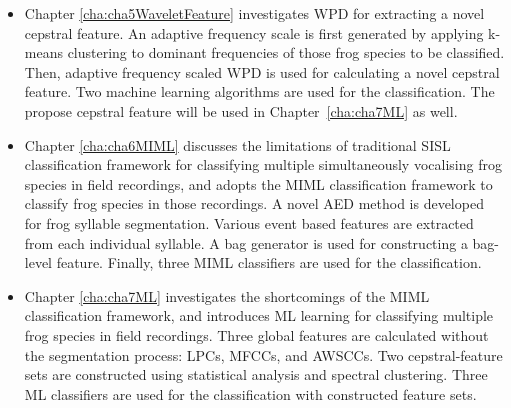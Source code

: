 \begin{itemize}
\item  Chapter \ref{cha:cha5WaveletFeature} investigates WPD for extracting a novel cepstral feature. An adaptive frequency scale is first generated by applying k-means clustering to dominant frequencies of those frog species to be classified. Then, adaptive frequency scaled WPD is used for calculating a novel cepstral feature. Two machine learning algorithms are used for the classification. The propose cepstral feature will be used in Chapter~\ref{cha:cha7ML} as well.




\item  Chapter \ref{cha:cha6MIML} discusses the limitations of traditional SISL classification framework for classifying multiple simultaneously vocalising frog species in field recordings, and adopts the MIML classification framework to classify frog species in those recordings. A novel AED method is developed for frog syllable segmentation. Various event based features are extracted from each individual syllable. A bag generator is used for constructing a bag-level feature. Finally, three MIML classifiers are used for the classification.

 


\item  Chapter \ref{cha:cha7ML} investigates the shortcomings of the MIML classification framework, and introduces ML learning for classifying multiple frog species in field recordings. Three global features are calculated without the segmentation process: LPCs, MFCCs, and AWSCCs. Two cepstral-feature sets are constructed using statistical analysis and spectral clustering.
Three ML classifiers are used for the classification with constructed feature sets.






\end{itemize}
